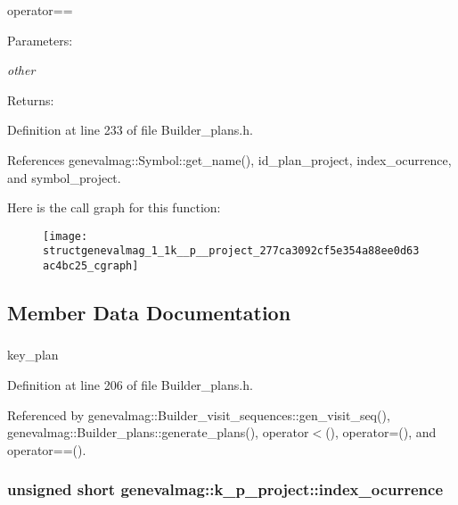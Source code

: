 operator== \begin{Desc}
\item[Parameters:]
\begin{description}
\item[{\em other}]\end{description}
\end{Desc}
\begin{Desc}
\item[Returns:]\end{Desc}


Definition at line 233 of file Builder\_\-plans.h.

References genevalmag::Symbol::get\_\-name(), id\_\-plan\_\-project, index\_\-ocurrence, and symbol\_\-project.

Here is the call graph for this function:\nopagebreak
\begin{figure}[H]
\begin{center}
\leavevmode
\texttt{[image: structgenevalmag\_1\_1k\_\_p\_\_project\_277ca3092cf5e354a88ee0d63ac4bc25\_cgraph]}
\end{center}
\end{figure}


\subsection{Member Data Documentation}
\hypertarget{structgenevalmag_1_1k__p__project_fc065645098439a308c5ca879e5e5a51}{
\subsubsection[{id\_\-plan\_\-project}]{}}
\label{structgenevalmag_1_1k__p__project_fc065645098439a308c5ca879e5e5a51}


key\_\-plan 



Definition at line 206 of file Builder\_\-plans.h.

Referenced by genevalmag::Builder\_\-visit\_\-sequences::gen\_\-visit\_\-seq(), genevalmag::Builder\_\-plans::generate\_\-plans(), operator$<$(), operator=(), and operator==().\hypertarget{structgenevalmag_1_1k__p__project_42b98a1d22cb7215bdc7a0432f94cbcc}{
\subsubsection[{index\_\-ocurrence}]{\setlength{\rightskip}{0pt plus 5cm}unsigned short {\bf genevalmag::k\_\-p\_\-project::index\_\-ocurrence}}}
\label{structgenevalmag_1_1k__p__project_42b98a1d22cb7215bdc7a0432f94cbcc}




